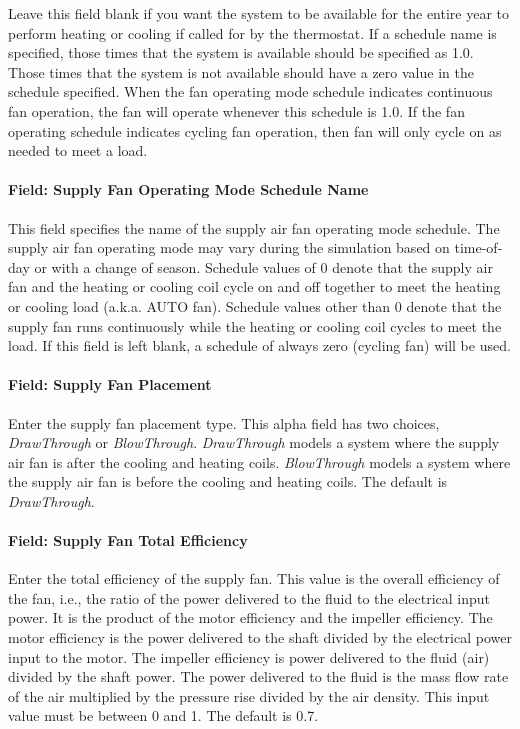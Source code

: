 Leave this field blank if you want the system to be available for the entire year to perform heating or cooling if called for by the thermostat. If a schedule name is specified, those times that the system is available should be specified as 1.0. Those times that the system is not available should have a zero value in the schedule specified. When the fan operating mode schedule indicates continuous fan operation, the fan will operate whenever this schedule is 1.0. If the fan operating schedule indicates cycling fan operation, then fan will only cycle on as needed to meet a load.

\paragraph{Field: Supply Fan Operating Mode Schedule Name}\label{field-supply-fan-operating-mode-schedule-name}

This field specifies the name of the supply air fan operating mode schedule. The supply air fan operating mode may vary during the simulation based on time-of-day or with a change of season. Schedule values of 0 denote that the supply air fan and the heating or cooling coil cycle on and off together to meet the heating or cooling load (a.k.a. AUTO fan). Schedule values other than 0 denote that the supply fan runs continuously while the heating or cooling coil cycles to meet the load. If this field is left blank, a schedule of always zero (cycling fan) will be used.

\paragraph{Field: Supply Fan Placement}\label{field-supply-fan-placement}

Enter the supply fan placement type. This alpha field has two choices, \emph{DrawThrough} or \emph{BlowThrough}. \emph{DrawThrough} models a system where the supply air fan is after the cooling and heating coils. \emph{BlowThrough} models a system where the supply air fan is before the cooling and heating coils. The default is \emph{DrawThrough}.

\paragraph{Field: Supply Fan Total Efficiency}\label{field-supply-fan-total-efficiency-1}

Enter the total efficiency of the supply fan. This value is the overall efficiency of the fan, i.e., the ratio of the power delivered to the fluid to the electrical input power. It is the product of the motor efficiency and the impeller efficiency. The motor efficiency is the power delivered to the shaft divided by the electrical power input to the motor. The impeller efficiency is power delivered to the fluid (air) divided by the shaft power. The power delivered to the fluid is the mass flow rate of the air multiplied by the pressure rise divided by the air density. This input value must be between 0 and 1. The default is 0.7.

